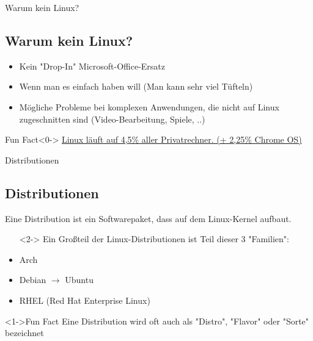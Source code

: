 \begin{frame}{Warum kein Linux?}
    \subsection{Warum kein Linux?}\label{subsec:warum-kein-linux?}

    \begin{itemize}
        \item<1-> Kein "Drop-In" Microsoft-Office-Ersatz
        \item<2-> Wenn man es einfach haben will (Man kann sehr viel Tüfteln)
        \item<3-> Mögliche Probleme bei komplexen Anwendungen, die nicht auf Linux zugeschnitten sind (Video-Bearbeitung, Spiele, ..)
    \end{itemize}

    \vspace{0.5cm}
    \begin{exampleblock}{Fun Fact}<0->
        \href{https://gs.statcounter.com/os-market-share/desktop/worldwide}{Linux läuft auf 4,5\% aller Privatrechner. (+ 2,25\% Chrome OS)}
    \end{exampleblock}

\end{frame}

\begin{frame}{Distributionen}
    \subsection{Distributionen}\label{subsec:distributionen}

    Eine Distribution ist ein Softwarepaket, dass auf dem Linux-Kernel aufbaut.

    \begin{itemize}
        \item[]<2-> Ein Großteil der Linux-Distributionen ist Teil dieser 3 "Familien":
    \end{itemize}

    \begin{itemize}
        \item<3-> Arch
        \item<4-> Debian $\longrightarrow$ Ubuntu
        \item<5-> RHEL (Red Hat Enterprise Linux)
    \end{itemize}

    \vspace{0.5cm}
    \begin{exampleblock}<1->{Fun Fact}
        Eine Distribution wird oft auch als "Distro", "Flavor" oder "Sorte" bezeichnet
    \end{exampleblock}

\end{frame}


